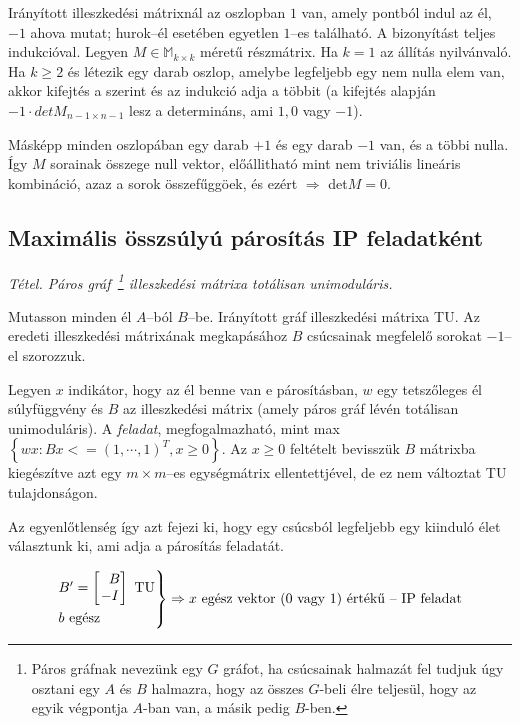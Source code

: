 Irányított illeszkedési mátrixnál az oszlopban $1$ van, amely pontból indul az
él, $-1$ ahova mutat; hurok--él esetében egyetlen $1$--es található. A
bizonyítást teljes indukcióval. Legyen $M \in \mathbb{M}_{k\times k}$ méretű
részmátrix. Ha $k=1$ az állítás nyilvánvaló. Ha $k \geq 2$ és létezik egy darab
oszlop, amelybe legfeljebb egy nem nulla elem van, akkor kifejtés a szerint és
az indukció adja a többit (a kifejtés alapján $-1\cdot detM_{n-1\times n-1}$
lesz a determináns, ami $1,0$ vagy $-1$).

Másképp minden oszlopában egy darab $+1$ és egy darab $-1$ van, és a többi
nulla. Így $M$ sorainak összege null vektor, előállitható mint nem triviális
lineáris kombináció, azaz a sorok összefűggöek, és ezért $\Rightarrow$ det$M=0$.

\subsection{Maximális összsúlyú párosítás IP feladatként}

\emph{Tétel. Páros gráf~\footnote{Páros gráfnak nevezünk egy $G$ gráfot, ha
csúcsainak halmazát fel tudjuk úgy osztani egy $A$ és $B$ halmazra, hogy az
összes $G$-beli élre teljesül, hogy az egyik végpontja $A$-ban van, a másik
pedig $B$-ben.} illeszkedési mátrixa totálisan unimoduláris.}
\vspace{0.4cm}

Mutasson minden él $A$--ból $B$--be. Irányított gráf illeszkedési mátrixa TU. Az
eredeti illeszkedési mátrixának megkapásához $B$ csúcsainak megfelelő sorokat
$-1$--el szorozzuk.

Legyen $x$ indikátor, hogy az él benne van e párosításban, $w$ egy tetszőleges
él súlyfüggvény és $B$ az illeszkedési mátrix (amely páros gráf lévén totálisan
unimoduláris). A \emph{feladat}, megfogalmazható, mint max$\left\{ wx:Bx <= (1,
\cdots, 1)^T, x \geq 0 \right\}$. Az $x \geq 0 $ feltételt bevisszük $B$
mátrixba kiegészítve azt egy $m \times m$--es egységmátrix ellentettjével, de ez
nem változtat TU tulajdonságon.

Az egyenlőtlenség így azt fejezi ki, hogy egy csúcsból legfeljebb egy kiinduló
élet választunk ki, ami adja a párosítás feladatát.

\[
\begin{rcases}
B'=\begin{bmatrix} ~~B \\ -I \end{bmatrix} \text{ TU} \\
b \text{ egész}
\end{rcases} \Rightarrow x \text{ egész vektor ($0$ vagy $1$) értékű -- IP feladat}
\]

